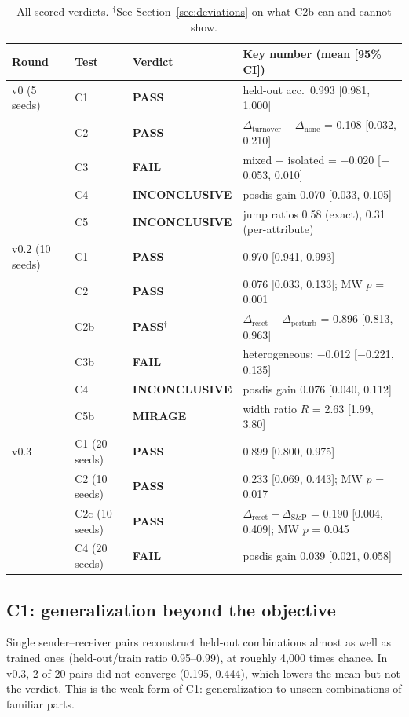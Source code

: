 \documentclass[11pt]{article}
\newcommand{\pass}{\textbf{PASS}}
\newcommand{\fail}{\textbf{FAIL}}
\newcommand{\inc}{\textbf{INCONCLUSIVE}}
\newcommand{\mirage}{\textbf{MIRAGE}}
\begin{document}
\begin{table}[t]
\centering\small
\begin{tabular}{@{}llll@{}}
\toprule
Round & Test & Verdict & Key number (mean [95\% CI]) \\
\midrule
v0 (5 seeds) & C1 & \pass & held-out acc.\ 0.993 [0.981, 1.000] \\
 & C2 & \pass & $\Delta_\text{turnover}-\Delta_\text{none}$ = 0.108 [0.032, 0.210] \\
 & C3 & \fail & mixed $-$ isolated = $-$0.020 [$-$0.053, 0.010] \\
 & C4 & \inc & posdis gain 0.070 [0.033, 0.105] \\
 & C5 & \inc & jump ratios 0.58 (exact), 0.31 (per-attribute) \\
\midrule
v0.2 (10 seeds) & C1 & \pass & 0.970 [0.941, 0.993] \\
 & C2 & \pass & 0.076 [0.033, 0.133]; MW $p$ = 0.001 \\
 & C2b & \pass$^\dagger$ & $\Delta_\text{reset}-\Delta_\text{perturb}$ = 0.896 [0.813, 0.963] \\
 & C3b & \fail & heterogeneous: $-$0.012 [$-$0.221, 0.135] \\
 & C4 & \inc & posdis gain 0.076 [0.040, 0.112] \\
 & C5b & \mirage & width ratio $R$ = 2.63 [1.99, 3.80] \\
\midrule
v0.3 & C1 (20 seeds) & \pass & 0.899 [0.800, 0.975] \\
 & C2 (10 seeds) & \pass & 0.233 [0.069, 0.443]; MW $p$ = 0.017 \\
 & C2c (10 seeds) & \pass & $\Delta_\text{reset}-\Delta_\text{S\&P}$ = 0.190 [0.004, 0.409]; MW $p$ = 0.045 \\
 & C4 (20 seeds) & \fail & posdis gain 0.039 [0.021, 0.058] \\
\bottomrule
\end{tabular}
\caption{All scored verdicts. $^\dagger$See Section~\ref{sec:deviations} on what C2b can and
cannot show.}
\label{tab:profile}
\end{table}

\subsection{C1: generalization beyond the objective}
Single sender--receiver pairs reconstruct held-out combinations almost as well as trained ones
(held-out/train ratio 0.95--0.99), at roughly 4{,}000 times chance. In v0.3, 2 of 20 pairs did not
converge (0.195, 0.444), which lowers the mean but not the verdict. This is the weak form of C1:
generalization to unseen combinations of familiar parts.
\end{document}
